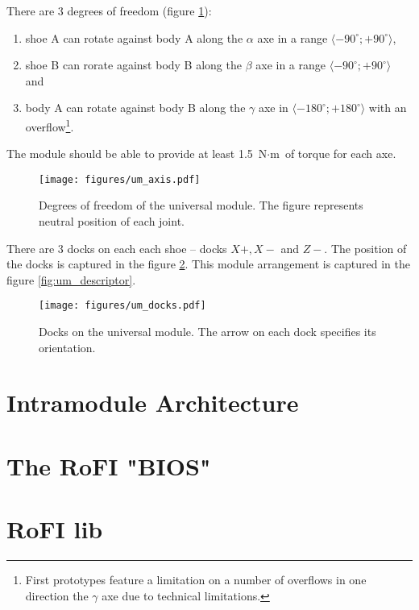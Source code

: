 There are 3 degrees of freedom (figure \ref{fig:um_axis}):
\begin{enumerate}
    \item shoe A can rotate against body A along the $\alpha$ axe in a range
    $\langle -90^\circ; +90^\circ\rangle$,
    \item shoe B can rorate against body B along the $\beta$ axe in a range
    $\langle -90^\circ; +90^\circ\rangle$ and
    \item body A can rotate against body B along the $\gamma$ axe in $\langle
    -180^\circ; +180^\circ\rangle$ with an overflow\footnote{First prototypes
    feature a limitation on a number of overflows in one direction the $\gamma$
    axe due to technical limitations. }.
\end{enumerate}
The module should be able to provide at least 1.5 $\text{N}\cdot\text{m}$ of
torque for each axe.

\begin{figure}
    \centering
    \texttt{[image: figures/um\_axis.pdf]}
    \caption{Degrees of freedom of the universal module. The figure represents neutral position of each joint.}
    \label{fig:um_axis}
\end{figure}

There are 3 docks on each each shoe -- docks $X+, X-$ and $Z-$. The position of
the docks is captured in the figure \ref{fig:um_docks}. This module arrangement
is captured in the figure \ref{fig:um_descriptor}.

\begin{figure}
    \centering
    \texttt{[image: figures/um\_docks.pdf]}
    \caption{Docks on the universal module. The arrow on each dock specifies its orientation.}
    \label{fig:um_docks}
\end{figure}

\section{Intramodule Architecture}

\section{The RoFI "BIOS" }

\section{RoFI lib}

